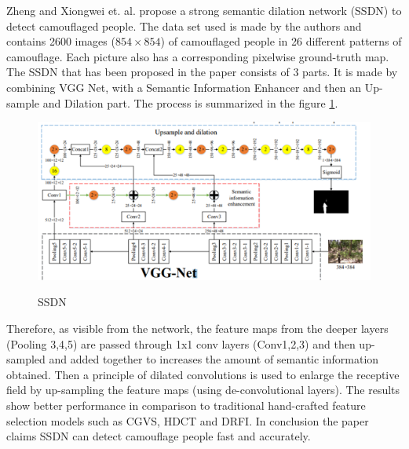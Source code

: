 \documentclass[conference]{IEEEtran}
\begin{document}
Zheng and Xiongwei et. al. \cite{ 10.1145/3321408.3326662} propose a strong semantic dilation network (SSDN) to detect camouflaged people. The data set used is made by the authors and contains 2600 images ($854 \times 854$) of camouflaged people in 26 different patterns of camouflage. Each picture also has a corresponding pixelwise ground-truth map. The SSDN that has been proposed in the paper consists of 3 parts. It is made by combining VGG Net, with a Semantic Information Enhancer and then an Up-sample and Dilation part. The process is summarized in the figure \ref{fig2}.
\begin{figure}[h]
    \centering
    \includegraphics[width=\linewidth]{2.png}\\
    \caption{SSDN}
    \label{fig2}
\end{figure}
\newline
Therefore, as visible from the network, the feature maps from the deeper layers (Pooling 3,4,5) are passed through 1x1 conv layers (Conv1,2,3) and then up-sampled and added together to increases the amount of semantic information obtained. Then a principle of dilated convolutions is used to enlarge the receptive field by up-sampling the feature maps (using de-convolutional layers). The results show better performance in comparison to traditional hand-crafted feature selection models such as CGVS, HDCT and DRFI. In conclusion the paper claims SSDN can detect camouflage people fast and accurately.
\end{document}
